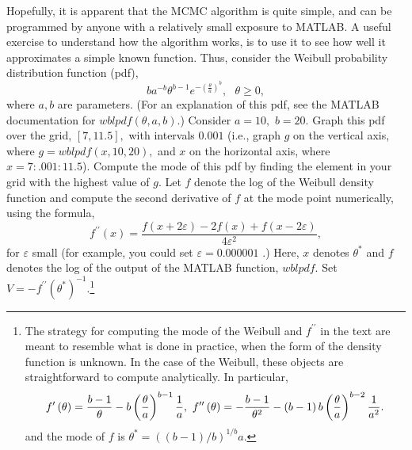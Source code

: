 \documentclass[12pt,thmsa]{article}
\begin{document}
\begin{enumerate}
Hopefully, it is apparent that the MCMC algorithm is quite simple, and can
be programmed by anyone with a relatively small exposure to MATLAB. A useful
exercise to understand how the algorithm works, is to use it to see how well
it approximates a simple known function. Thus, consider the Weibull
probability distribution function (pdf), 
\begin{equation*}
ba^{-b}\theta ^{b-1}e^{-\left( \frac{\theta }{a}\right) ^{b}},\text{ }\theta
\geq 0,
\end{equation*}%
where $a,b$ are parameters. (For an explanation of this pdf, see the MATLAB
documentation for $wblpdf(\theta ,a,b).$) Consider $a=10,$ $b=20.$ Graph
this pdf over the grid, $\left[ 7,11.5\right] ,$ with intervals $0.001$
(i.e., graph $g$ on the vertical axis, where $g=wblpdf(x,10,20),$ and $x$ on
the horizontal axis, where $x=7:.001:11.5$). Compute the mode of this pdf by
finding the element in your grid with the highest value of $g.$ Let $f$
denote the log of the Weibull density function and compute the second
derivative of $f$ at the mode point numerically, using the formula,%
\begin{equation*}
f^{\prime \prime }\left( x\right) =\frac{f\left( x+2\varepsilon \right)
-2f\left( x\right) +f\left( x-2\varepsilon \right) }{4\varepsilon ^{2}},
\end{equation*}%
for $\varepsilon $ small (for example, you could set $\varepsilon =0.000001$%
.) Here, $x$ denotes $\theta ^{\ast }$ and $f$ denotes the log of the output
of the MATLAB function, $wblpdf.$ Set $V=-f^{\prime \prime }\left( \theta
^{\ast }\right) ^{-1}.$\footnote{%
The strategy for computing the mode of the Weibull and $f^{\prime \prime }$
in the text are meant to resemble what is done in practice, when the form of
the density function is unknown. In the case of the Weibull, these objects
are straightforward to compute analytically. In particular, 
\begin{equation*}
f^{\prime }\left( \theta \right) =\frac{b-1}{\theta }-b\left( \frac{\theta }{%
a}\right) ^{b-1}\frac{1}{a},\text{ }f^{\prime \prime }\left( \theta \right)
=-\frac{b-1}{\theta ^{2}}-\left( b-1\right) b\left( \frac{\theta }{a}\right)
^{b-2}\frac{1}{a^{2}}.
\end{equation*}%
and the mode of $f$ is $\theta ^{\ast }=\left( \left( b-1\right) /b\right)
^{1/b}a.$}


\end{enumerate}
\end{document}
